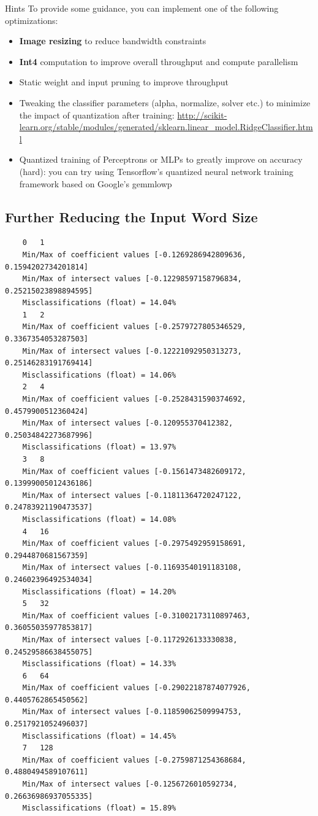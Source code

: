 Hints To provide some guidance, you can implement one of the following optimizations:

\begin{itemize}
    \item \textbf{Image resizing} to reduce bandwidth constraints
    \item \textbf{Int4} computation to improve overall throughput and compute parallelism
    \item Static weight and input pruning to improve throughput
    \item Tweaking the classifier parameters (alpha, normalize, solver etc.) to minimize the impact of quantization after training: \url{http://scikit-learn.org/stable/modules/generated/sklearn.linear_model.RidgeClassifier.html}
    \item Quantized training of Perceptrons or MLPs to greatly improve on accuracy (hard): you can try using Tensorflow's quantized neural network training framework based on Google's gemmlowp
\end{itemize}




\subsection{Further Reducing the Input Word Size}

\begin{verbatim}
    0	1
    Min/Max of coefficient values [-0.1269286942809636, 0.1594202734201814]
    Min/Max of intersect values [-0.12298597158796834, 0.25215023898894595]
    Misclassifications (float) = 14.04%
    1	2
    Min/Max of coefficient values [-0.2579727805346529, 0.3367354053287503]
    Min/Max of intersect values [-0.12221092950313273, 0.25146283191769414]
    Misclassifications (float) = 14.06%
    2	4
    Min/Max of coefficient values [-0.2528431590374692, 0.4579900512360424]
    Min/Max of intersect values [-0.120955370412382, 0.25034842273687996]
    Misclassifications (float) = 13.97%
    3	8
    Min/Max of coefficient values [-0.1561473482609172, 0.13999005012436186]
    Min/Max of intersect values [-0.11811364720247122, 0.24783921190473537]
    Misclassifications (float) = 14.08%
    4	16
    Min/Max of coefficient values [-0.2975492959158691, 0.2944870681567359]
    Min/Max of intersect values [-0.11693540191183108, 0.24602396492534034]
    Misclassifications (float) = 14.20%
    5	32
    Min/Max of coefficient values [-0.31002173110897463, 0.36055035977853817]
    Min/Max of intersect values [-0.1172926133330838, 0.24529586638455075]
    Misclassifications (float) = 14.33%
    6	64
    Min/Max of coefficient values [-0.29022187874077926, 0.4405762865450562]
    Min/Max of intersect values [-0.11859062509994753, 0.2517921052496037]
    Misclassifications (float) = 14.45%
    7	128
    Min/Max of coefficient values [-0.2759871254368684, 0.4880494589107611]
    Min/Max of intersect values [-0.1256726010592734, 0.26636986937055335]
    Misclassifications (float) = 15.89%
\end{verbatim}
